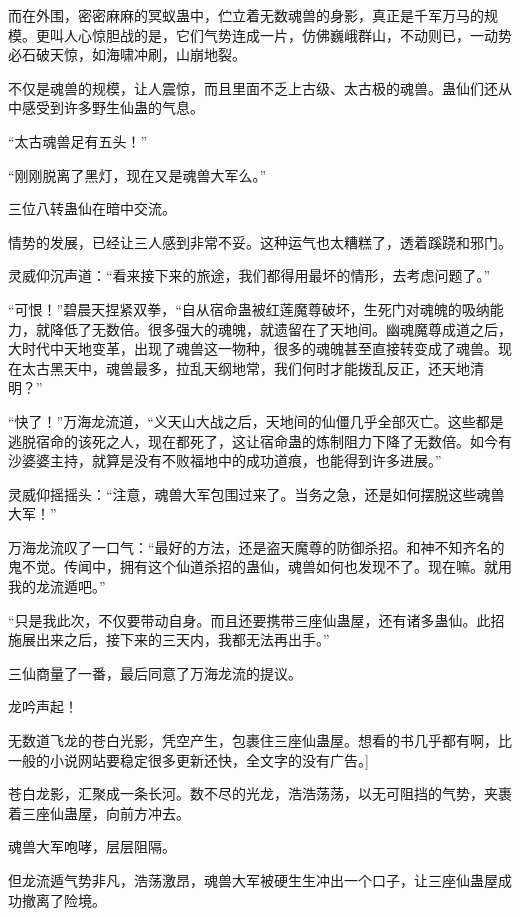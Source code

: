 
\begin{this_body}

而在外围，密密麻麻的冥蚁蛊中，伫立着无数魂兽的身影，真正是千军万马的规模。更叫人心惊胆战的是，它们气势连成一片，仿佛巍峨群山，不动则已，一动势必石破天惊，如海啸冲刷，山崩地裂。

不仅是魂兽的规模，让人震惊，而且里面不乏上古级、太古极的魂兽。蛊仙们还从中感受到许多野生仙蛊的气息。

“太古魂兽足有五头！”

“刚刚脱离了黑灯，现在又是魂兽大军么。”

三位八转蛊仙在暗中交流。

情势的发展，已经让三人感到非常不妥。这种运气也太糟糕了，透着蹊跷和邪门。

灵威仰沉声道：“看来接下来的旅途，我们都得用最坏的情形，去考虑问题了。”

“可恨！”碧晨天捏紧双拳，“自从宿命蛊被红莲魔尊破坏，生死门对魂魄的吸纳能力，就降低了无数倍。很多强大的魂魄，就遗留在了天地间。幽魂魔尊成道之后，大时代中天地变革，出现了魂兽这一物种，很多的魂魄甚至直接转变成了魂兽。现在太古黑天中，魂兽最多，拉乱天纲地常，我们何时才能拨乱反正，还天地清明？”

“快了！”万海龙流道，“义天山大战之后，天地间的仙僵几乎全部灭亡。这些都是逃脱宿命的该死之人，现在都死了，这让宿命蛊的炼制阻力下降了无数倍。如今有沙婆婆主持，就算是没有不败福地中的成功道痕，也能得到许多进展。”

灵威仰摇摇头：“注意，魂兽大军包围过来了。当务之急，还是如何摆脱这些魂兽大军！”

万海龙流叹了一口气：“最好的方法，还是盗天魔尊的防御杀招。和神不知齐名的鬼不觉。传闻中，拥有这个仙道杀招的蛊仙，魂兽如何也发现不了。现在嘛。就用我的龙流遁吧。”

“只是我此次，不仅要带动自身。而且还要携带三座仙蛊屋，还有诸多蛊仙。此招施展出来之后，接下来的三天内，我都无法再出手。”

三仙商量了一番，最后同意了万海龙流的提议。

龙吟声起！

无数道飞龙的苍白光影，凭空产生，包裹住三座仙蛊屋。想看的书几乎都有啊，比一般的小说网站要稳定很多更新还快，全文字的没有广告。]

苍白龙影，汇聚成一条长河。数不尽的光龙，浩浩荡荡，以无可阻挡的气势，夹裹着三座仙蛊屋，向前方冲去。

魂兽大军咆哮，层层阻隔。

但龙流遁气势非凡，浩荡激昂，魂兽大军被硬生生冲出一个口子，让三座仙蛊屋成功撤离了险境。


\end{this_body}
